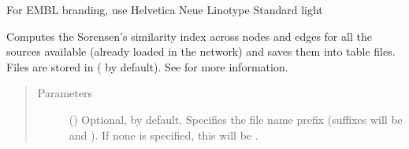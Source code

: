 \documentclass[letterpaper,10pt,english]{sphinxmanual}
\begin{document}
\begin{fulllineitems}

\begin{fulllineitems}
\label{\detokenize{main:pypath.main.PyPath.source_network}}
For EMBL branding, use Helvetica Neue Linotype Standard light

\end{fulllineitems}


\begin{fulllineitems}
\label{\detokenize{main:pypath.main.PyPath.source_similarity}}
Computes the Sorensen’s similarity index across nodes and edges
for all the sources available (already loaded in the network)
and saves them into table files. Files are stored in
 ( by default).
See {\hyperref[\detokenize{main:pypath.main.PyPath.databases_similarity}]{}} for more
information.
\begin{quote}\begin{description}
\item[{Parameters}] \leavevmode
{} () \textendash{} Optional,  by default. Specifies the file name
prefix (suffixes will be  and ). If
none is specified, this will be
.

\end{description}\end{quote}

\end{fulllineitems}


\begin{fulllineitems}
\label{\detokenize{main:pypath.main.PyPath.source_stats}}
\end{fulllineitems}


\end{fulllineitems}
\end{document}
